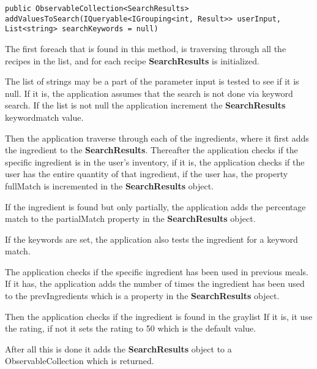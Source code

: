 \begin{lstlisting}[caption=addValuesToSearch, label={lst:addValuesToSearch}, language=CSharp]
        public ObservableCollection<SearchResults> addValuesToSearch(IQueryable<IGrouping<int, Result>> userInput, List<string> searchKeywords = null)
\end{lstlisting}

The first foreach that is found in this method, is traversing through all the recipes in the list, and for each recipe \textbf{SearchResults} is initialized.

The list of strings may be a part of the parameter input is tested to see if it is null. If it is, the application assumes that the search is not done via keyword search. If the list is not null the application increment the \textbf{SearchResults} keywordmatch value.

Then the application traverse through each of the ingredients, where it first adds the ingredient to the \textbf{SearchResults}. Thereafter the application checks if the specific ingredient is in the user's inventory, if it is, the application checks if the user has the entire quantity of that ingredient, if the user has, the property fullMatch is incremented in the \textbf{SearchResults} object.

If the ingredient is found but only partially, the application adds the percentage match to the partialMatch property in the \textbf{SearchResults} object.

If the keywords are set, the application also tests the ingredient for a keyword match.

The application checks if the specific ingredient has been used in previous meals.
If it has, the application adds the number of times the ingredient has been used to the prevIngredients which is a property in the \textbf{SearchResults} object.

Then the application checks if the ingredient is found in the graylist If it is, it use the rating, if not it sets the rating to 50 which is the default value.

After all this is done it adds the \textbf{SearchResults} object to a ObservableCollection which is returned.